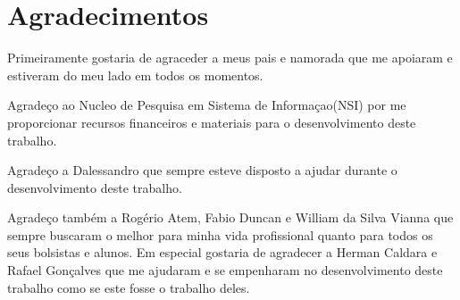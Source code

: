 \chapter*{Agradecimentos}
\thispagestyle{empty}
Primeiramente gostaria de agraceder a meus pais e namorada que me apoiaram e estiveram do meu lado em todos os momentos.

Agradeço ao Nucleo de Pesquisa em Sistema de Informaçao(NSI) por me proporcionar recursos financeiros e materiais para o desenvolvimento deste trabalho.

Agradeço a Dalessandro que sempre esteve disposto a ajudar durante o desenvolvimento deste trabalho. 

Agradeço também a Rogério Atem, Fabio Duncan e William da Silva Vianna que sempre buscaram o melhor para minha vida profissional quanto para todos os seus bolsistas e alunos. Em especial gostaria de agradecer a Herman Caldara e Rafael Gonçalves que me ajudaram e se empenharam no desenvolvimento deste trabalho como se este fosse o trabalho deles.
 
\thispagestyle{empty} 
